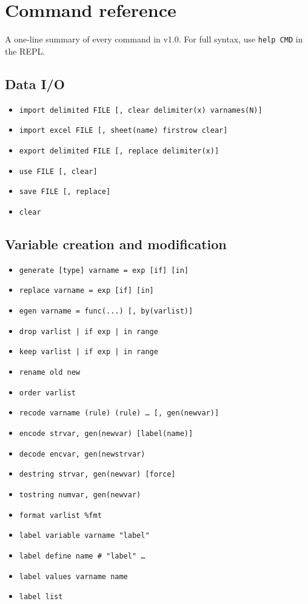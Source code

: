 \documentclass[11pt,letterpaper]{article}
\newcommand{\teaversion}{1.0}
\begin{document}
\section{Command reference}

A one-line summary of every command in v\teaversion.  For full syntax,
use \texttt{help CMD} in the REPL.

\subsection*{Data I/O}
\begin{itemize}[leftmargin=*,itemsep=0pt]
\item \texttt{import delimited FILE [, clear delimiter(x) varnames(N)]}
\item \texttt{import excel FILE [, sheet(name) firstrow clear]}
\item \texttt{export delimited FILE [, replace delimiter(x)]}
\item \texttt{use FILE [, clear]}
\item \texttt{save FILE [, replace]}
\item \texttt{clear}
\end{itemize}

\subsection*{Variable creation and modification}
\begin{itemize}[leftmargin=*,itemsep=0pt]
\item \texttt{generate [type] varname = exp [if] [in]}
\item \texttt{replace varname = exp [if] [in]}
\item \texttt{egen varname = func(...) [, by(varlist)]}
\item \texttt{drop varlist | if exp | in range}
\item \texttt{keep varlist | if exp | in range}
\item \texttt{rename old new}
\item \texttt{order varlist}
\item \texttt{recode varname (rule) (rule) \ldots\ [, gen(newvar)]}
\item \texttt{encode strvar, gen(newvar) [label(name)]}
\item \texttt{decode encvar, gen(newstrvar)}
\item \texttt{destring strvar, gen(newvar) [force]}
\item \texttt{tostring numvar, gen(newvar)}
\item \texttt{format varlist \%fmt}
\item \texttt{label variable varname "label"}
\item \texttt{label define name \# "label" \ldots}
\item \texttt{label values varname name}
\item \texttt{label list}
\end{itemize}
\end{document}
